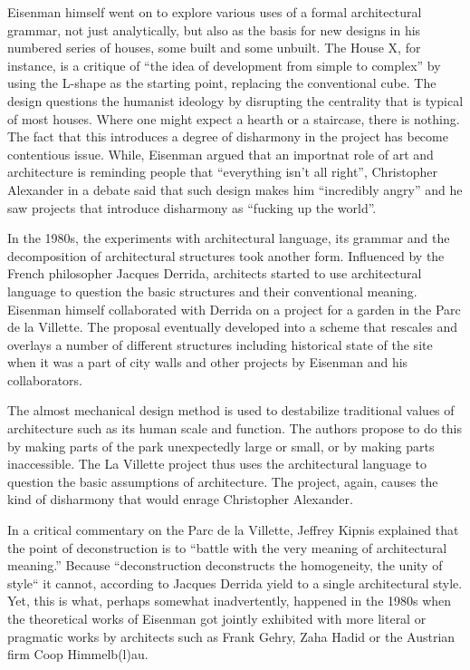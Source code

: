 Eisenman himself went on to explore various uses of a formal architectural
grammar, not just analytically, but also as the basis for new designs in his numbered series of
houses, some built and some unbuilt. The House X, for instance, is a critique of ``the idea of
development from simple to complex'' by using the L-shape as the
starting point, replacing the conventional cube. The design questions the humanist ideology
by disrupting the centrality that is typical of most houses. Where one might expect a hearth or
a staircase, there is nothing. The fact that this introduces a degree of disharmony in the project
has become contentious issue. While, Eisenman argued that an importnat role of art and architecture
is reminding people that ``everything isn't all right'', Christopher Alexander in a debate said
that such design makes him ``incredibly angry'' and he saw projects that introduce disharmony
as ``fucking up the world''.

In the 1980s, the experiments with architectural language, its grammar and the decomposition
of architectural structures took another form. Influenced by the French philosopher Jacques
Derrida, architects started to use architectural language to question the basic structures
and their conventional meaning. Eisenman himself collaborated with Derrida on a
project for a garden in the Parc de la Villette. The proposal eventually developed into a scheme that rescales and overlays a number of different structures including
historical state of the site when it was a part of city walls and other projects by Eisenman
and his collaborators.

The almost mechanical design method is used to destabilize traditional
values of architecture such as its human scale and function. The authors propose to do this by
making parts of the park unexpectedly large or small, or by making parts inaccessible.
The La Villette project thus uses the architectural language to question the basic assumptions
of architecture. The project, again, causes the kind of disharmony that would enrage Christopher
Alexander.

In a critical commentary on the Parc de la Villette, Jeffrey Kipnis explained that
the point of deconstruction is to ``battle with the very meaning of architectural
meaning.'' Because ``deconstruction deconstructs the
homogeneity, the unity of style`` it cannot, according to Jacques Derrida yield to
a single architectural style. Yet, this is what, perhaps somewhat inadvertently, happened
in the 1980s when the theoretical works of Eisenman got jointly exhibited with more literal
or pragmatic works by architects such as Frank Gehry, Zaha Hadid or the Austrian firm Coop
Himmelb(l)au. %


